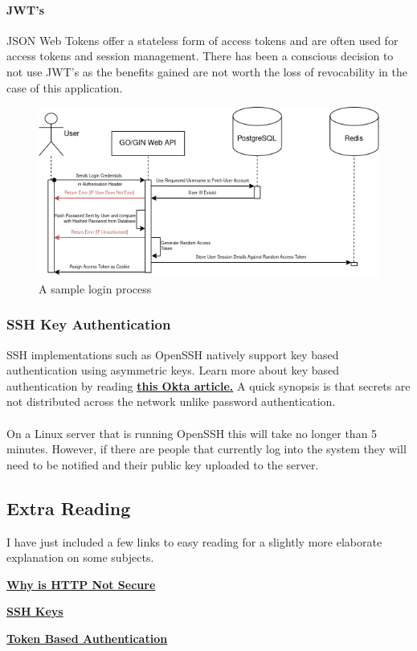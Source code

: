 \paragraph{JWT's}
JSON Web Tokens offer a stateless form of access tokens and are often used for access tokens and session management.
There has been a conscious decision to not use JWT's as the benefits gained are not worth the loss of revocability in the case of this application.

\begin{figure}[h!]
    \includegraphics[width=\textwidth]{res/token_authorisation}
    \caption{A sample login process}
    \label{fig:loggin-in-sample}
\end{figure}

\subsubsection{SSH Key Authentication}
SSH implementations such as OpenSSH natively support key based authentication using asymmetric keys.
Learn more about key based authentication by reading \href{https://www.okta.com/identity-101/asymmetric-encryption/}{\textbf{this Okta article.}}
A quick synopsis is that secrets are not distributed across the network unlike password authentication.

\paragraph{}
On a Linux server that is running OpenSSH this will take no longer than 5 minutes.
However, if there are people that currently log into the system they will need to be notified and their public key uploaded to the server.

\subsection{Extra Reading}\label{subsec:extra-reading}
I have just included a few links to easy reading for a slightly more elaborate explanation on some subjects.

\begin{description}
    \item \href{https://www.cloudflare.com/en-au/learning/ssl/why-is-http-not-secure/}{\textbf{Why is HTTP Not Secure}}
    \item \href{https://wiki.archlinux.org/title/SSH_keys}{\textbf{SSH Keys}}
    \item \href{https://www.okta.com/identity-101/what-is-token-based-authentication/}{\textbf{Token Based Authentication}}
\end{description}
